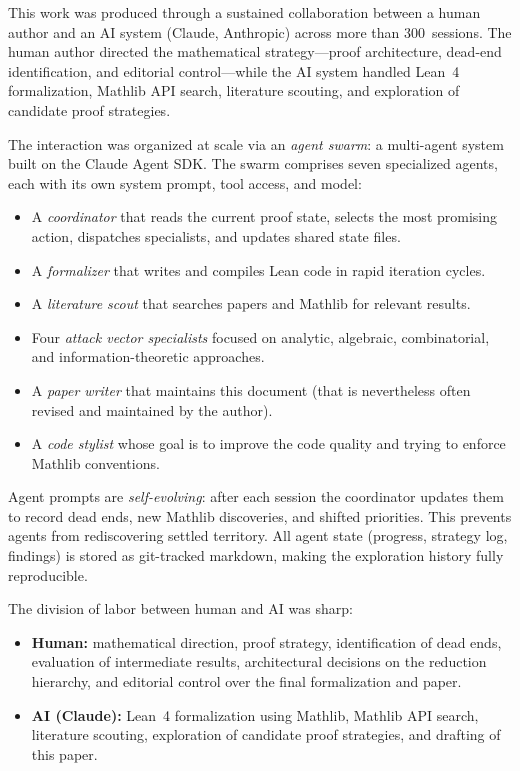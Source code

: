 This work was produced through a sustained collaboration between a
human author and an AI system (Claude, Anthropic) across more than 300~sessions.
The human author directed the mathematical strategy---proof
architecture, dead-end identification, and editorial control---while
the AI system handled Lean~4 formalization, Mathlib API search,
literature scouting, and exploration of candidate proof strategies.

The interaction was organized at scale via an \emph{agent swarm}:
a multi-agent system built on the Claude Agent SDK\@.  The swarm comprises
seven specialized agents, each with its own system prompt, tool access,
and model:

\begin{itemize}[nosep]
\item A \emph{coordinator} that reads the current proof state,
  selects the most promising action, dispatches specialists, and updates
  shared state files.
\item A \emph{formalizer} that writes and compiles Lean code
  in rapid iteration cycles.
\item A \emph{literature scout} that searches papers and Mathlib
  for relevant results.
\item Four \emph{attack vector specialists} focused on analytic,
  algebraic, combinatorial, and information-theoretic approaches.
\item A \emph{paper writer} that maintains this document (that is nevertheless often revised and maintained by the author).
\item A \emph{code stylist} whose goal is to improve the code quality and trying to enforce Mathlib conventions.
\end{itemize}

Agent prompts are \emph{self-evolving}: after each session the
coordinator updates them to record dead ends, new Mathlib discoveries,
and shifted priorities.  This prevents agents from rediscovering settled
territory.  All agent state (progress, strategy log, findings) is stored
as git-tracked markdown, making the exploration history fully
reproducible.

The division of labor between human and AI was sharp:

\begin{itemize}[nosep]
\item \textbf{Human:} mathematical direction, proof strategy,
  identification of dead ends, evaluation of intermediate results,
  architectural decisions on the reduction hierarchy, and editorial
  control over the final formalization and paper.
\item \textbf{AI (Claude):} Lean~4 formalization using Mathlib,
  Mathlib API search, literature scouting, exploration of candidate proof
  strategies, and drafting of this paper.
\end{itemize}

